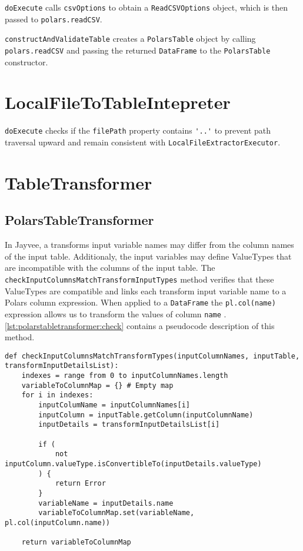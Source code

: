 \Verb|doExecute| calls \Verb|csvOptions| to obtain a \Verb|ReadCSVOptions| object, which is then passed to \Verb|polars.readCSV|.

\Verb|constructAndValidateTable| creates a \Verb|PolarsTable| object by calling \Verb|polars.readCSV| and passing the returned \Verb|DataFrame| to the \Verb|PolarsTable| constructor.

\section{LocalFileToTableIntepreter}
\Verb|doExecute| checks if the \Verb|filePath| property contains \Verb|'..'| to prevent path traversal upward and remain consistent with \Verb|LocalFileExtractorExecutor|.

\section{TableTransformer}

\subsection{PolarsTableTransformer}
In Jayvee, a transforms input variable names may differ from the column names of the input table.
Additionaly, the input variables may define ValueTypes that are incompatible with the columns of the input table.
The \Verb|checkInputColumnsMatchTransformInputTypes| method verifies that these ValueTypes are compatible and links each transform input variable name to a Polars column expression.
When applied to a \Verb|DataFrame| the \Verb|pl.col(name)| expression allows us to transform the values of column \Verb|name| \autocite{polars:docs:expr:col}.
\ref{lst:polarstabletransformer:check} contains a pseudocode description of this method.
\begin{listing}
	\begin{verbatim}
def checkInputColumnsMatchTransformTypes(inputColumnNames, inputTable, transformInputDetailsList):
	indexes = range from 0 to inputColumnNames.length
	variableToColumnMap = {} # Empty map
	for i in indexes:
		inputColumName = inputColumnNames[i]
		inputColumn = inputTable.getColumn(inputColumnName)
		inputDetails = transformInputDetailsList[i]

		if (
			not inputColumn.valueType.isConvertibleTo(inputDetails.valueType)
		) {
			return Error
		}
		variableName = inputDetails.name
		variableToColumnMap.set(variableName, pl.col(inputColumn.name))

	return variableToColumnMap
	\end{verbatim}
	\caption{}
	\label{lst:polarstabletransformer:check}
\end{listing}

